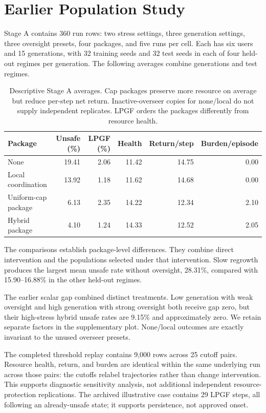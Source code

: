\section{Earlier Population Study}\label{app:population-study}
Stage A contains 360 run rows: two stress settings, three generation settings, three oversight presets, four packages, and five runs per cell. Each has six users and 15 generations, with 32 training seeds and 32 test seeds in each of four held-out regimes per generation. The following averages combine generations and test regimes.

\begin{table}[h]
\centering\small
\begin{tabular}{lrrrrr}
\toprule
Package & Unsafe (\%) & LPGF (\%) & Health & Return/step & Burden/episode\\
\midrule
None & 19.41 & 2.06 & 11.42 & 14.75 & 0.00\\
Local coordination & 13.92 & 1.18 & 11.62 & 14.68 & 0.00\\
Uniform-cap package & 6.13 & 2.35 & 14.22 & 12.34 & 2.10\\
Hybrid package & 4.10 & 1.24 & 14.33 & 12.52 & 2.05\\
\bottomrule
\end{tabular}
\caption{Descriptive Stage A averages. Cap packages preserve more resource on average but reduce per-step net return. Inactive-overseer copies for none/local do not supply independent replicates. LPGF orders the packages differently from resource health.}
\end{table}

The comparisons establish package-level differences. They combine direct intervention and the populations selected under that intervention. Slow regrowth produces the largest mean unsafe rate without oversight, 28.31\%, compared with 15.90--16.88\% in the other held-out regimes.

The earlier scalar gap combined distinct treatments. Low generation with weak oversight and high generation with strong oversight both receive gap zero, but their high-stress hybrid unsafe rates are 9.15\% and approximately zero. We retain separate factors in the supplementary plot. None/local outcomes are exactly invariant to the unused overseer presets.

The completed threshold replay contains 9,000 rows across 25 cutoff pairs. Resource health, return, and burden are identical within the same underlying run across those pairs: the cutoffs relabel trajectories rather than change intervention. This supports diagnostic sensitivity analysis, not additional independent resource-protection replications. The archived illustrative case contains 29 LPGF steps, all following an already-unsafe state; it supports persistence, not approved onset.
